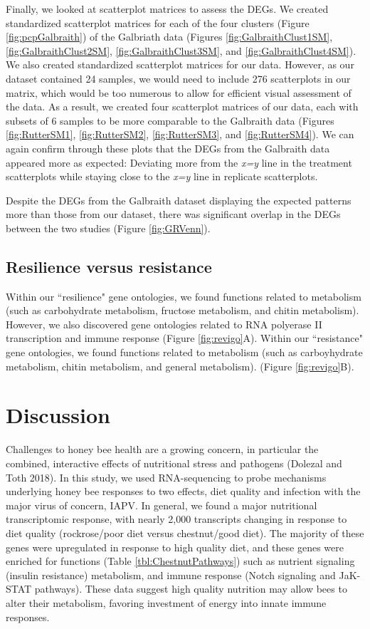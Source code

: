 \documentclass[11pt,a4paper,oldfontcommands,openany]{memoir}
\numberwithin{equation}{section} %
\begin{document}
Finally, we looked at scatterplot matrices to assess the DEGs. We created standardized scatterplot matrices for each of the four clusters (Figure \ref{fig:pcpGalbraith}) of the Galbriath data (Figures \ref{fig:GalbraithClust1SM}, \ref{fig:GalbraithClust2SM}, \ref{fig:GalbraithClust3SM}, and \ref{fig:GalbraithClust4SM}). We also created standardized scatterplot matrices for our data. However, as our dataset contained 24 samples, we would need to include 276 scatterplots in our matrix, which would be too numerous to allow for efficient visual assessment of the data. As a result, we created four scatterplot matrices of our data, each with subsets of 6 samples to be more comparable to the Galbraith data (Figures \ref{fig:RutterSM1}, \ref{fig:RutterSM2}, \ref{fig:RutterSM3}, and \ref{fig:RutterSM4}). We can again confirm through these plots that the DEGs from the Galbraith data appeared more as expected: Deviating more from the \textit{x=y} line in the treatment scatterplots while staying close to the \textit{x=y} line in replicate scatterplots.

Despite the DEGs from the Galbraith dataset displaying the expected patterns more than those from our dataset, there was significant overlap in the DEGs between the two studies (Figure \ref{fig:GRVenn}).

\subsection{Resilience versus resistance}

Within our ``resilience" gene ontologies, we found functions related to metabolism (such as carbohydrate metabolism, fructose metabolism, and chitin metabolism). However, we also discovered gene ontologies related to RNA polyerase II transcription and immune response (Figure \ref{fig:revigo}A). Within our ``resistance" gene ontologies, we found functions related to metabolism (such as carboyhydrate metabolism, chitin metabolism, and general metabolism).  (Figure \ref{fig:revigo}B). 

\section{Discussion}

Challenges to honey bee health are a growing concern, in particular the combined, interactive effects of nutritional stress and pathogens (Dolezal and Toth 2018). In this study, we used RNA-sequencing to probe mechanisms underlying honey bee responses to two effects, diet quality and infection with the major virus of concern, IAPV. In general, we found a major nutritional transcriptomic response, with nearly 2,000 transcripts changing in response to diet quality (rockrose/poor diet versus chestnut/good diet). The majority of these genes were upregulated in response to high quality diet, and these genes were enriched for functions (Table \ref{tbl:ChestnutPathways}) such as nutrient signaling (insulin resistance) metabolism, and immune response (Notch signaling and JaK-STAT pathways). These data suggest high quality nutrition may allow bees to alter their metabolism, favoring investment of energy into innate immune responses.  
\end{document}
